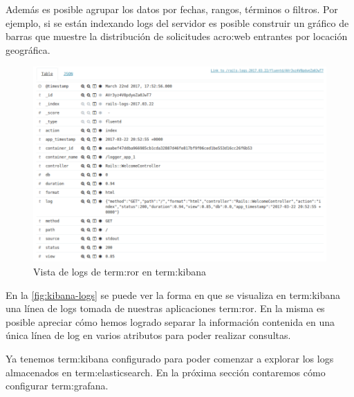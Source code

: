 Además es posible agrupar los datos por fechas, rangos, términos o filtros. Por
ejemplo, si se están indexando logs del servidor es posible construir un
gráfico de barras que muestre la distribución de solicitudes \gls{acro:web}
entrantes por locación geográfica.

\begin{figure}
  \includegraphics[width=\linewidth]{src/images/05-capitulo-5/kibana-logs.png}
  \caption{Vista de logs de \gls{term:ror} en \gls{term:kibana}}
  \label{fig:kibana-logs}
\end{figure}

En la \autoref{fig:kibana-logs} se puede ver la forma en que se visualiza en
\gls{term:kibana} una línea de logs tomada de nuestras aplicaciones
\gls{term:ror}. En la misma es posible apreciar cómo hemos logrado separar la
información contenida en una única línea de log en varios atributos para poder
realizar consultas.

Ya tenemos \gls{term:kibana} configurado para poder comenzar a explorar los
logs almacenados en \gls{term:elasticsearch}. En la próxima sección contaremos
cómo configurar \gls{term:grafana}.
